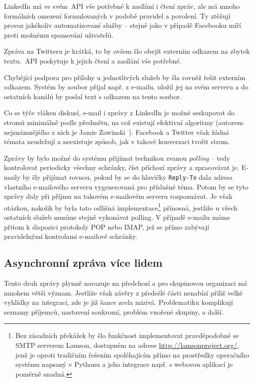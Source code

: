 \documentclass[12pt,oneside,final]{fithesis2}
\begin{document}
LinkedIn má ve svém~API vše potřebné k zasílání i čtení zpráv, ale má mnoho formálních omezení formulovaných v podobě pravidel a povolení. Ty ztěžují provoz jakékoliv automatizované služby -- stejně jako v případě Facebooku míří proti možnému spamování uživatelů.

Zpráva na Twitteru je krátká, to by ovšem šlo obejít externím odkazem na zbytek textu.~API poskytuje k jejich čtení a zasílání vše potřebné.

Chybějící podpora pro přílohy u jednotlivých služeb by šla rovněž řešit externím odkazem. Systém by soubor přijal např. z e-mailu, uložil jej na svém serveru a do ostatních kanálů by poslal text s odkazem na tento soubor.

Co se týče vláken diskusí, e-mail i zprávy z LinkedIn je možné seskupovat do stromů minimálně podle předmětu, na což existují efektivní algoritmy (autorem nejznámnějšího z nich je Jamie Zawinski~\cite{zawinski2002message}). Facebook a Twitter však žádná témata neudržují a neexistuje způsob, jak v takové konverzaci tvořit strom.

Zprávy by bylo možné do systému přijímat technikou zvanou \emph{polling} -- tedy kontrolovat periodicky všechny schránky, číst příchozí zprávy a zpracovávat je. E-maily by šly přijímat rovnou, pokud by se do hlavičky {\tt Reply-To} dala adresa vlastního e-mailového serveru vygenerovaná pro příslušné téma. Potom by se tyto zprávy daly při příjmu na takovém e-mailovém serveru rozpoznávat. Je však otázkou, nakolik by byla tato odlišná implementace\footnote{Bez zásadních překážek by šlo funkčnost implementovat pravděpodobně se SMTP serverem Lamson, dostupném na adrese \url{http://lamsonproject.org/}, jenž je oproti tradičním řešením spoléhajícím přímo na prostředky operačního systému napsaný v Pythonu a jeho integrace např. s webovou aplikací je poměrně snadná.} přínosná, jestliže u všech ostatních služeb musíme stejně vykonávat polling. V případě e-mailu máme přitom k dispozici protokoly POP nebo IMAP, jež se přímo zabývají pravidelnými kontrolami e-mailové schránky.

\subsection{Asynchronní zpráva více lidem}
Tento druh zprávy plynně navazuje na předchozí a pro skupinovou organizaci má mnohem větší význam. Jestliže však závěry z předešlé části nenabízí příliš velké vyhlídky na integraci, zde je již šance zcela mizivá. Problematiku komplikují seznamy příjemců, nastavení soukromí, problém vnořené skupiny, a další.
\end{document}
